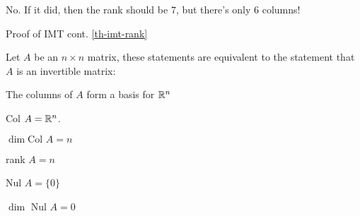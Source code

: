 \begin{card}
\begin{compactdesc}
        No. If it did, then the rank should be $7$, but there's only $6$ columns!
    \item[Proof of IMT cont. \ref{th-imt-rank}]
    \end{compactdesc}
    \begin{theorem}\label{th-imt-rank}
    Let $A$ be an $n\times n$ matrix, these statements are equivalent to the
    statement that $A$ is an invertible matrix:
    \begin{compactenum}
    \item The columns of $A$ form a basis for $\mathbb{R}^n$
    \item Col $A = \mathbb{R}^n$.
    \item $\dim \text{Col } A = n$
    \item rank $A = n$
    \item Nul $A = \{0\}$
    \item $\dim$ Nul $A = 0$
    \end{compactenum}
    \end{theorem}
\end{card}
